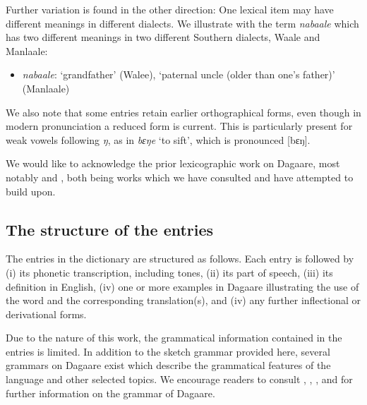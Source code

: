 \begin{refsection}
\noindent Further variation is found in the other direction: One lexical item may have different meanings in different dialects. We illustrate with the term \textit{nabaale} which has two different meanings in two different Southern dialects, Waale and Manlaale:


\begin{itemize}\item \textit{nabaale}: `grandfather' (Walee), `paternal uncle (older than one’s father)'  (Manlaale)
\end{itemize}


We also note that some entries retain earlier orthographical forms, even though in modern pronunciation a reduced form is current.  This is particularly present for weak vowels following \textit{ŋ}, as in \textit{bɛŋe}  `to sift', which is pronounced [bɛŋ].



We would like to acknowledge the prior lexicographic work on Dagaare, most notably \citet{Durand1953} and \citet{Bodomo2004cantonese}, both being works which we have consulted and have attempted to build upon.



\subsection*{The structure of the entries}



The entries in the dictionary are structured as follows.  Each entry is followed by (i) its phonetic transcription, including tones, (ii) its part of speech, (iii) its definition in English, (iv) one or more examples in Dagaare illustrating the use of the word and the corresponding translation(s), and (iv) any further inflectional or derivational forms.  

Due to the nature of this work, the grammatical information contained in the entries is limited.  In addition to the sketch grammar provided here, several grammars on Dagaare exist which describe the grammatical features of the language and other selected topics.  We encourage readers to consult \citet{Bodomo1997},  \citet{Bodomo2000}, \citet{Bodomo2004cantonese,Bodomo2004complex}, and \citet{Dakubu2005} for further information on the grammar of Dagaare.


\end{refsection}
